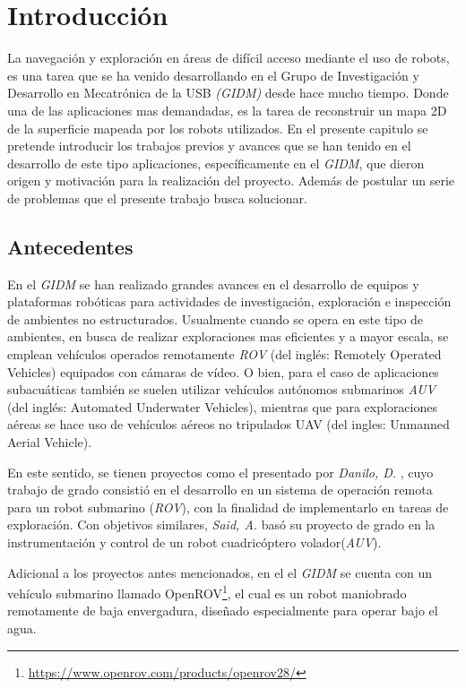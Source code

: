 \chapter{Introducción}
\label{capitulo1}

La navegación y exploración en áreas de difícil acceso mediante el uso de robots, es una tarea que se ha venido desarrollando en el Grupo de Investigación y Desarrollo en Mecatrónica de la USB  \textit{(GIDM)} desde hace mucho tiempo. Donde una de las aplicaciones mas demandadas, es la tarea de reconstruir un mapa 2D de la superficie mapeada por los robots utilizados. En el presente capitulo se pretende introducir los trabajos previos y avances que se han tenido en el desarrollo de este tipo aplicaciones, específicamente en el \textit{GIDM}, que dieron origen y motivación para la realización del proyecto. Además de postular un serie de problemas que el presente trabajo busca solucionar.

\section{Antecedentes}

En el \textit{GIDM} se han realizado grandes avances en el desarrollo de equipos y plataformas robóticas para actividades de investigación, exploración e inspección de ambientes no estructurados. Usualmente cuando se opera en este tipo de ambientes, en busca de realizar exploraciones mas eficientes y a mayor escala, se emplean vehículos operados remotamente \textit{ROV} (del inglés: Remotely Operated Vehicles) equipados con cámaras de vídeo. O bien, para el caso de aplicaciones subacuáticas también se suelen utilizar vehículos autónomos submarinos \textit{AUV} (del inglés: Automated Underwater Vehicles), mientras que para exploraciones aéreas se hace uso de vehículos aéreos no tripulados UAV (del ingles: Unmanned Aerial Vehicle).

En este sentido, se tienen proyectos como el presentado por \textit{Danilo, D.} \cite{danilo}, cuyo trabajo de grado consistió en el desarrollo en un sistema de operación remota para un robot submarino (\textit{ROV}), con la finalidad de implementarlo en tareas de exploración. Con objetivos similares, \textit{Said, A.} \cite{said} basó su proyecto de grado en la instrumentación y control de un robot cuadricóptero volador(\textit{AUV}). 

Adicional a los proyectos antes mencionados, en el el \textit{GIDM}  se cuenta con un vehículo submarino llamado OpenROV\footnote{ \url{https://www.openrov.com/products/openrov28/}}, el cual es un robot maniobrado remotamente de baja envergadura, diseñado especialmente para operar bajo el agua.

